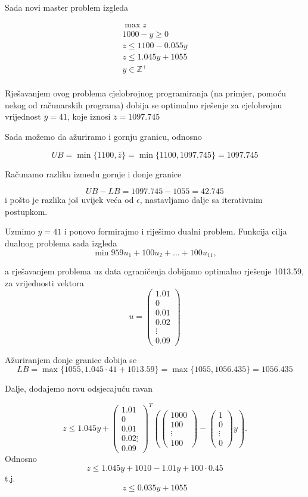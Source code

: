 \documentclass[a4paper, utf8, 11pt, colorlinks]{book}
\theoremstyle{definition}
\begin{document}
Sada novi master problem izgleda 


$$
\begin{aligned}
	\max z\\
	1000-y\geqslant 0\\
	z\leqslant 1100-0.055y\\ 
	z\leqslant 1.045y+1055\\
	y\in\mathbb{Z}^+\\	
\end{aligned}
$$


Rješavanjem ovog problema cjelobrojnog programiranja (na primjer, pomoću nekog od računarskih programa) dobija se optimalno rješenje za cjelobrojnu vrijednost $\overline{y}=41$, koje iznosi $\overline{z} = 1097.745$

Sada možemo da ažuriramo i gornju granicu, odnosno 

$$UB = \min\{1100,\overline{z}\} =  \min\{1100,1097.745\} =1097.745$$

Računamo razliku između gornje i donje granice

$$UB-LB=1097.745-1055 = 42.745$$
i pošto je razlika još uvijek veća od $\epsilon$, nastavljamo dalje sa iterativnim postupkom.

Uzmimo $\overline{y}=41$ i ponovo formirajmo i riješimo dualni problem. 
Funkcija cilja dualnog problema sada izgleda 
$$\min 959u_1+ 100u_2+\ldots+100u_{11},$$

a rješavanjem problema uz data ograničenja dobijamo optimalno rješenje 1013.59, za vrijednosti vektora 
$$u=\left(\begin{array}{c}
	1.01 \\
	0 \\
	0.01\\
	0.02\\
	\vdots \\
	0.09
\end{array}\right)$$

Ažuriranjem donje granice dobija se 
$$LB = \max\{1055,1.045\cdot41+1013.59\} = \max\{1055,1056.435\} = 1056.435 $$

Dalje, dodajemo novu odsjecajuću ravan

$$z\leqslant 1.045y+\left(\begin{array}{c}
	1.01 \\
	0 \\
	0.01\\
	0.02
	\vdots \\
	0.09
\end{array}\right)^T
\left(\left(\begin{array}{c}
	1000 \\
	100 \\
	\vdots \\
	100
\end{array}\right)-\left(\begin{array}{c}
	1 \\
	0 \\
	\vdots \\
	0
\end{array}\right)y\right).$$
Odnosno 
$$z\leqslant 1.045y+1010-1.01y+100\cdot0.45$$
t.j.
$$z\leqslant 0.035y+1055$$
\end{document}
